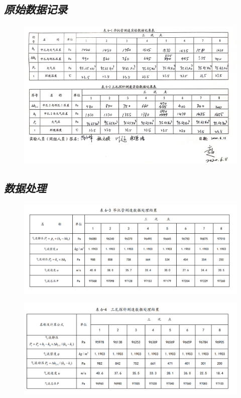 \documentclass[UTF8]{article}
\begin{document}
	\subsection{\textit{原始数据记录}}
	\begin{figure}[H]
		\centering
		\includegraphics[width=\linewidth]{figure/origin}
		\label{fig:origin}
	\end{figure}
	\subsection{\textit{数据处理}}
	\begin{figure}[H]
		\centering
		\includegraphics[width=0.9\linewidth]{figure/fig1}
		\label{fig:fig1}
	\end{figure}
	\begin{figure}[H]
		\centering
		\includegraphics[width=0.9\linewidth]{figure/fig2}
		\label{fig:fig2}
	\end{figure}
	
\end{document}
